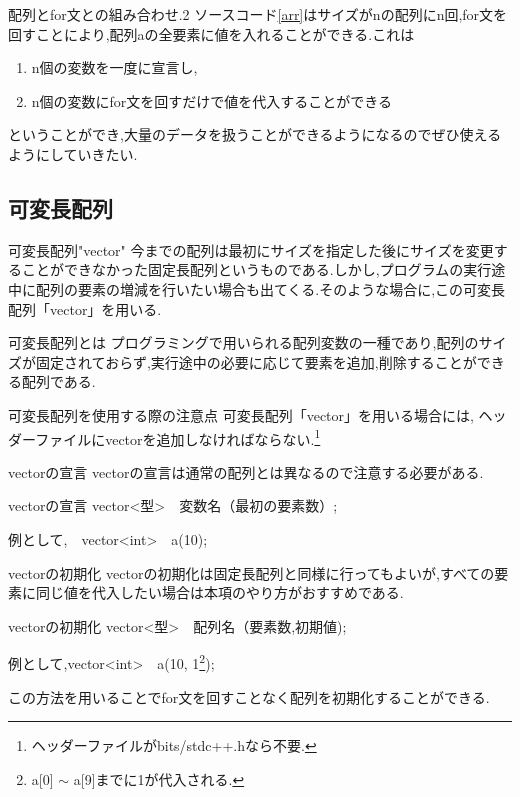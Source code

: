 \documentclass[xdvipdfmx, 8pt, t]{beamer}
\begin{document}
\begin{frame}{配列とfor文との組み合わせ.2}
    ソースコード\ref{arr}はサイズがnの配列にn回,for文を回すことにより,配列aの全要素に値を入れることができる.これは
    \begin{enumerate}
        \item n個の変数を一度に宣言し,
        \item n個の変数にfor文を回すだけで値を代入することができる
    \end{enumerate}
    ということができ,大量のデータを扱うことができるようになるのでぜひ使えるようにしていきたい.
\end{frame}
\subsection{可変長配列}
\begin{frame}{可変長配列"vector"}
    今までの配列は最初にサイズを指定した後にサイズを変更することができなかった固定長配列というものである.しかし,プログラムの実行途中に配列の要素の増減を行いたい場合も出てくる.そのような場合に,この可変長配列「vector」を用いる.
    \begin{block}{可変長配列とは}
        プログラミングで用いられる配列変数の一種であり,配列のサイズが固定されておらず,実行途中の必要に応じて要素を追加,削除することができる配列である.
    \end{block}
    \begin{alertblock}{可変長配列を使用する際の注意点}
        可変長配列「vector」を用いる場合には,
        ヘッダーファイルにvectorを追加しなければならない.\footnote{ヘッダーファイルがbits/stdc++.hなら不要.}
    \end{alertblock}
\end{frame}

\begin{frame}{vectorの宣言}
    vectorの宣言は通常の配列とは異なるので注意する必要がある.
    \begin{block}{vectorの宣言}
    vector<型>　変数名（最初の要素数）;

    例として,　vector<int>　a(10);
    \end{block}
\end{frame}

\begin{frame}{vectorの初期化}
    vectorの初期化は固定長配列と同様に行ってもよいが,すべての要素に同じ値を代入したい場合は本項のやり方がおすすめである.
    \begin{block}{vectorの初期化}
        vector<型>　配列名（要素数,初期値);

        例として,vector<int>　a(10, 1\footnote{a[0] $\sim$ a[9]までに1が代入される.});
    \end{block}
    この方法を用いることでfor文を回すことなく配列を初期化することができる.
    
\end{frame}
\end{document}
